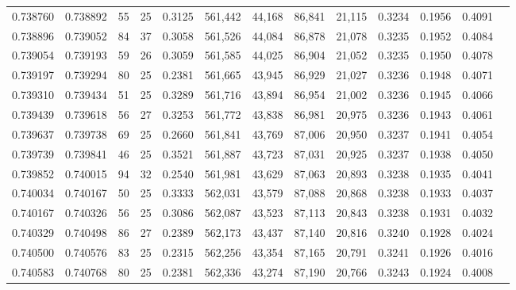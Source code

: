 \begin{tabular}{rrrrrrrrrrrrr}
0.738760 & 0.738892 &    55 &  25 &                                     0.3125 & 561,442 &  44,168 &  86,841 &  21,115 & 0.3234 & 0.1956 & 0.4091 \\
0.738896 & 0.739052 &    84 &  37 &                                     0.3058 & 561,526 &  44,084 &  86,878 &  21,078 & 0.3235 & 0.1952 & 0.4084 \\
0.739054 & 0.739193 &    59 &  26 &                                     0.3059 & 561,585 &  44,025 &  86,904 &  21,052 & 0.3235 & 0.1950 & 0.4078 \\
0.739197 & 0.739294 &    80 &  25 &                                     0.2381 & 561,665 &  43,945 &  86,929 &  21,027 & 0.3236 & 0.1948 & 0.4071 \\
0.739310 & 0.739434 &    51 &  25 &                                     0.3289 & 561,716 &  43,894 &  86,954 &  21,002 & 0.3236 & 0.1945 & 0.4066 \\
0.739439 & 0.739618 &    56 &  27 &                                     0.3253 & 561,772 &  43,838 &  86,981 &  20,975 & 0.3236 & 0.1943 & 0.4061 \\
0.739637 & 0.739738 &    69 &  25 &                                     0.2660 & 561,841 &  43,769 &  87,006 &  20,950 & 0.3237 & 0.1941 & 0.4054 \\
0.739739 & 0.739841 &    46 &  25 &                                     0.3521 & 561,887 &  43,723 &  87,031 &  20,925 & 0.3237 & 0.1938 & 0.4050 \\
0.739852 & 0.740015 &    94 &  32 &                                     0.2540 & 561,981 &  43,629 &  87,063 &  20,893 & 0.3238 & 0.1935 & 0.4041 \\
0.740034 & 0.740167 &    50 &  25 &                                     0.3333 & 562,031 &  43,579 &  87,088 &  20,868 & 0.3238 & 0.1933 & 0.4037 \\
0.740167 & 0.740326 &    56 &  25 &                                     0.3086 & 562,087 &  43,523 &  87,113 &  20,843 & 0.3238 & 0.1931 & 0.4032 \\
0.740329 & 0.740498 &    86 &  27 &                                     0.2389 & 562,173 &  43,437 &  87,140 &  20,816 & 0.3240 & 0.1928 & 0.4024 \\
0.740500 & 0.740576 &    83 &  25 &                                     0.2315 & 562,256 &  43,354 &  87,165 &  20,791 & 0.3241 & 0.1926 & 0.4016 \\
0.740583 & 0.740768 &    80 &  25 &                                     0.2381 & 562,336 &  43,274 &  87,190 &  20,766 & 0.3243 & 0.1924 & 0.4008 \\

\end{tabular}
